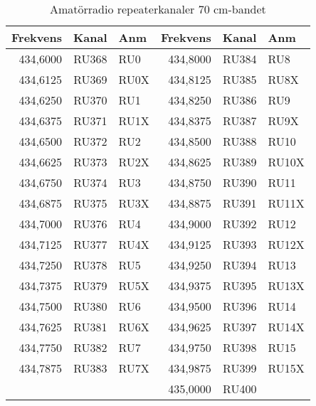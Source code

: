 \begin{longtable}{rrl|rrl}
\caption{Amatörradio repeaterkanaler 70 cm-bandet}\\
\textbf{Frekvens} & \textbf{Kanal} & \textbf{Anm}
&  \textbf{Frekvens} & \textbf{Kanal} & \textbf{Anm} \\ \hline

434,6000 & RU368 & RU0  & 434,8000 & RU384 & RU8   \\
434,6125 & RU369 & RU0X & 434,8125 & RU385 & RU8X  \\
434,6250 & RU370 & RU1  & 434,8250 & RU386 & RU9   \\
434,6375 & RU371 & RU1X & 434,8375 & RU387 & RU9X  \\
434,6500 & RU372 & RU2  & 434,8500 & RU388 & RU10  \\
434,6625 & RU373 & RU2X & 434,8625 & RU389 & RU10X \\
434,6750 & RU374 & RU3  & 434,8750 & RU390 & RU11  \\
434,6875 & RU375 & RU3X & 434,8875 & RU391 & RU11X \\
434,7000 & RU376 & RU4  & 434,9000 & RU392 & RU12  \\
434,7125 & RU377 & RU4X & 434,9125 & RU393 & RU12X \\
434,7250 & RU378 & RU5  & 434,9250 & RU394 & RU13  \\
434,7375 & RU379 & RU5X & 434,9375 & RU395 & RU13X \\
434,7500 & RU380 & RU6  & 434,9500 & RU396 & RU14  \\
434,7625 & RU381 & RU6X & 434,9625 & RU397 & RU14X \\
434,7750 & RU382 & RU7  & 434,9750 & RU398 & RU15  \\
434,7875 & RU383 & RU7X & 434,9875 & RU399 & RU15X \\
         &       &      & 435,0000 & RU400 &       \\
\end{longtable}

\normalsize


\clearpage

